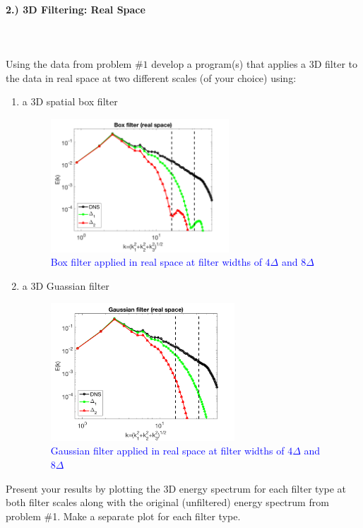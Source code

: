 \documentclass[11pt]{article}
\begin{document}
\paragraph{2.) 3D Filtering: Real Space}~\\\\
Using the data from problem $\#1$ develop a program(s) that applies a 3D filter to the data in real space at two different scales (of your choice) using:
\begin{enumerate}[label=(\alph*),topsep=-10pt]
	\item a 3D spatial box filter
	\begin{figure}[H]
	\centering
	\includegraphics[width=0.63\textwidth]{real_box}
	~\\\textcolor{blue}{Box filter applied in real space at filter widths of $4\Delta$ and $8\Delta$}
	\end{figure}
	\item a 3D Guassian filter
	\begin{figure}[H]
	\centering
	\includegraphics[width=0.65\textwidth]{real_gaussian}
	~\\\textcolor{blue}{Gaussian filter applied in real space at filter widths of $4\Delta$ and $8\Delta$}
	\end{figure}
\end{enumerate}
Present your results by plotting the 3D energy spectrum for each filter type at both filter scales along with the original (unfiltered) energy spectrum from problem \#1. Make a separate plot for each filter type.
\end{document}
